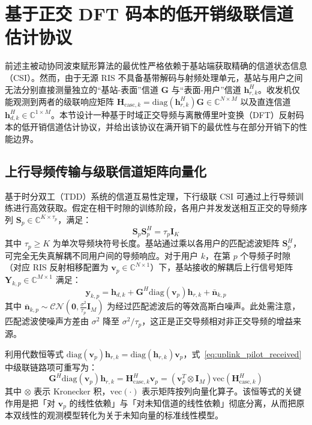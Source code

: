 \section{基于正交 DFT 码本的低开销级联信道估计协议}
\label{sec:channel_estimation}

前述主被动协同波束赋形算法的最优性严格依赖于基站端获取精确的信道状态信息（CSI）。然而，由于无源 RIS 不具备基带解码与射频处理单元，基站与用户之间无法分别直接测量独立的“基站-表面”信道 $\bm{G}$ 与“表面-用户”信道 $\bm{h}_{r,k}^H$。收发机仅能观测到两者的级联响应矩阵 $\bm{H}_{\mathrm{casc},k} = \mathrm{diag}(\bm{h}_{r,k}^H)\bm{G} \in \mathbb{C}^{N \times M}$ 以及直连信道 $\bm{h}_{d,k}^H \in \mathbb{C}^{1 \times M}$。本节设计一种基于时域正交导频与离散傅里叶变换（DFT）反射码本的低开销信道估计协议，并给出该协议在满开销下的最优性与在部分开销下的性能边界。

\subsection{上行导频传输与级联信道矩阵向量化}
\label{sec:pilot_protocol}

基于时分双工（TDD）系统的信道互易性定理，下行级联 CSI 可通过上行导频训练进行高效获取。假定在相干时隙的训练阶段，各用户并发发送相互正交的导频序列 $\bm{S}_p \in \mathbb{C}^{K \times \tau_p}$，满足：
\begin{equation}
  \bm{S}_p \bm{S}_p^H = \tau_p \bm{I}_K
  \label{eq:pilot_orthogonality}
\end{equation}
其中 $\tau_p \ge K$ 为单次导频块符号长度。基站通过乘以各用户的匹配滤波矩阵 $\bm{S}_p^H$，可完全无失真解耦不同用户间的导频响应。对于用户 $k$，在第 $p$ 个导频子时隙（对应 RIS 反射相移配置为 $\bm{v}_p \in \mathbb{C}^{N \times 1}$）下，基站接收的解耦后上行信号矩阵 $\bm{Y}_{k,p} \in \mathbb{C}^{M \times 1}$ 满足：
\begin{equation}
  \bm{y}_{k,p} = \bm{h}_{d,k} + \bm{G}^H \mathrm{diag}(\bm{v}_p) \bm{h}_{r,k} + \bar{\bm{n}}_{k,p}
  \label{eq:uplink_pilot_received}
\end{equation}
其中 $\bar{\bm{n}}_{k,p} \sim \mathcal{CN}(\bm{0}, \frac{\sigma^2}{\tau_p}\bm{I}_M)$ 为经过匹配滤波后的等效高斯白噪声。此处需注意，匹配滤波使噪声方差由 $\sigma^2$ 降至 $\sigma^2/\tau_p$，这正是正交导频相对非正交导频的增益来源。

利用代数恒等式 $\mathrm{diag}(\bm{v}_p)\bm{h}_{r,k} = \mathrm{diag}(\bm{h}_{r,k})\bm{v}_p$，式~\eqref{eq:uplink_pilot_received}中级联链路项可重写为：
\begin{equation}
  \bm{G}^H \mathrm{diag}(\bm{v}_p) \bm{h}_{r,k} = \bm{H}_{\mathrm{casc},k}^H \bm{v}_p = \left( \bm{v}_p^T \otimes \bm{I}_M \right) \mathrm{vec}(\bm{H}_{\mathrm{casc},k}^H)
  \label{eq:kronecker_vectorization}
\end{equation}
其中 $\otimes$ 表示 Kronecker 积，$\mathrm{vec}(\cdot)$ 表示矩阵按列向量化算子。该恒等式的关键作用是把「对 $\bm{v}_p$ 的线性依赖」与「对未知信道的线性依赖」彻底分离，从而把原本双线性的观测模型转化为关于未知向量的标准线性模型。

